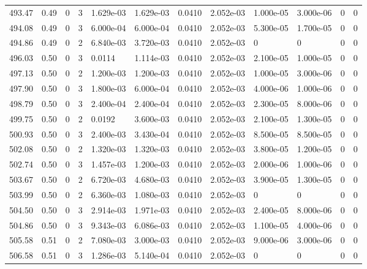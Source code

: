 \documentclass[preview]{standalone}
\begin{document}
{{{{{{{{{{{{{{{{\begin{tabular}{L{1.2cm}C{1.2cm} C{0.3cm}C{0.5cm} C{1.4cm}C{1.4cm} C{1.4cm}C{1.4cm} C{1.6cm}C{1.6cm} C{1.6cm}C{1.6cm}}
  493.47  &  0.49  & 0     &  3 &  1.629e-03  & 1.629e-03  &  0.0410&   2.052e-03& 1.000e-05 & 3.000e-06   &  0 & 0  \\ 
  494.08  &  0.49  & 0     &  3 &  6.000e-04  & 6.000e-04  &  0.0410&   2.052e-03& 5.300e-05 & 1.700e-05   &  0 & 0  \\ 
  494.86  &  0.49  & 0     &  2 &  6.840e-03  & 3.720e-03  &  0.0410&   2.052e-03& 0 & 0   &  0 & 0  \\ 
  496.03  &  0.50  & 0     &  3 &  0.0114  & 1.114e-03  &  0.0410&   2.052e-03& 2.100e-05 & 1.000e-05   &  0 & 0  \\ 
  497.13  &  0.50  & 0     &  2 &  1.200e-03  & 1.200e-03  &  0.0410&   2.052e-03& 1.000e-05 & 3.000e-06   &  0 & 0  \\ 
  497.90  &  0.50  & 0     &  3 &  1.800e-03  & 6.000e-04  &  0.0410&   2.052e-03& 4.000e-06 & 1.000e-06   &  0 & 0  \\ 
  498.79  &  0.50  & 0     &  3 &  2.400e-04  & 2.400e-04  &  0.0410&   2.052e-03& 2.300e-05 & 8.000e-06   &  0 & 0  \\ 
  499.75  &  0.50  & 0     &  2 &  0.0192  & 3.600e-03  &  0.0410&   2.052e-03& 2.100e-05 & 1.300e-05   &  0 & 0  \\ 
  500.93  &  0.50  & 0     &  3 &  2.400e-03  & 3.430e-04  &  0.0410&   2.052e-03& 8.500e-05 & 8.500e-05   &  0 & 0  \\ 
  502.08  &  0.50  & 0     &  2 &  1.320e-03  & 1.320e-03  &  0.0410&   2.052e-03& 3.800e-05 & 1.200e-05   &  0 & 0  \\ 
  502.74  &  0.50  & 0     &  3 &  1.457e-03  & 1.200e-03  &  0.0410&   2.052e-03& 2.000e-06 & 1.000e-06   &  0 & 0  \\ 
  503.67  &  0.50  & 0     &  2 &  6.720e-03  & 4.680e-03  &  0.0410&   2.052e-03& 3.900e-05 & 1.300e-05   &  0 & 0  \\ 
  503.99  &  0.50  & 0     &  2 &  6.360e-03  & 1.080e-03  &  0.0410&   2.052e-03& 0 & 0   &  0 & 0  \\ 
  504.50  &  0.50  & 0     &  3 &  2.914e-03  & 1.971e-03  &  0.0410&   2.052e-03& 2.400e-05 & 8.000e-06   &  0 & 0  \\ 
  504.86  &  0.50  & 0     &  3 &  9.343e-03  & 6.086e-03  &  0.0410&   2.052e-03& 1.100e-05 & 4.000e-06   &  0 & 0  \\ 
  505.58  &  0.51  & 0     &  2 &  7.080e-03  & 3.000e-03  &  0.0410&   2.052e-03& 9.000e-06 & 3.000e-06   &  0 & 0  \\ 
  506.58  &  0.51  & 0     &  3 &  1.286e-03  & 5.140e-04  &  0.0410&   2.052e-03& 0 & 0   &  0 & 0  \\ 

\end{tabular}}}}}}}}}}}}}}}}}
\end{document}
